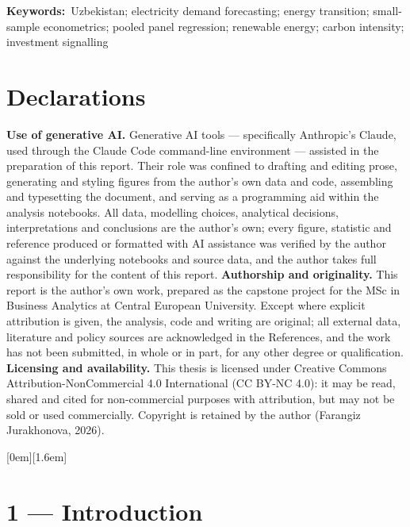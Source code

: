 \documentclass[10pt,twocolumn]{article}
\begin{document}
\vspace{4pt}\noindent\textbf{Keywords:}~Uzbekistan; electricity demand forecasting; energy transition; small-sample econometrics; pooled panel regression; renewable energy; carbon intensity; investment signalling
\section*{Declarations}
\textbf{Use of generative AI.} Generative AI tools --- specifically Anthropic's Claude, used through the Claude Code command-line environment --- assisted in the preparation of this report. Their role was confined to drafting and editing prose, generating and styling figures from the author's own data and code, assembling and typesetting the document, and serving as a programming aid within the analysis notebooks. All data, modelling choices, analytical decisions, interpretations and conclusions are the author's own; every figure, statistic and reference produced or formatted with AI assistance was verified by the author against the underlying notebooks and source data, and the author takes full responsibility for the content of this report.
\textbf{Authorship and originality.} This report is the author's own work, prepared as the capstone project for the MSc in Business Analytics at Central European University. Except where explicit attribution is given, the analysis, code and writing are original; all external data, literature and policy sources are acknowledged in the References, and the work has not been submitted, in whole or in part, for any other degree or qualification.
\textbf{Licensing and availability.} This thesis is licensed under Creative Commons Attribution-NonCommercial 4.0 International (CC BY-NC 4.0): it may be read, shared and cited for non-commercial purposes with attribution, but may not be sold or used commercially. Copyright is retained by the author (Farangiz Jurakhonova, 2026).
{\renewcommand{\baselinestretch}{0.9}\small\setlength{\parskip}{0.3pt}[0em]{\vspace{0.5pt}}{}{}{\contentspage}[1.6em]{}{}{}{\contentspage}\tableofcontents}
\endgroup
\clearpage\pagestyle{fancy}\twocolumn


\section*{1 --- Introduction}
\end{document}
